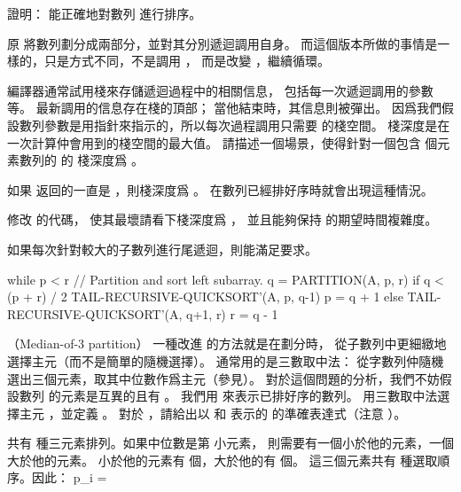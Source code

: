 \startigBase[a]
\startitem
證明：  能正確地對數列  進行排序。
\stopitem

\startANSWER
原  將數列劃分成兩部分，並對其分別遞迴調用自身。
而這個版本所做的事情是一樣的，只是方式不同，不是調用 ，
而是改變 ，繼續循環。
\stopANSWER
\stopigBase

編譯器通常試用{\EMP 棧}來存儲遞迴過程中的相關信息，
包括每一次遞迴調用的參數等。
最新調用的信息存在棧的頂部；
當他結束時，其信息則被{\EMP 彈出}。
因爲我們假設數列參數是用指針來指示的，所以每次過程調用只需要  的棧空間。
{\EMP 棧深度}是在一次計算仲會用到的棧空間的最大值。
\startigBase[a,continue]
\startitem
請描述一個場景，使得針對一個包含  個元素數列的  的
棧深度爲 。
\stopitem

\startANSWER
如果  返回的一直是 ，則棧深度爲 。
在數列已經排好序時就會出現這種情況。
\stopANSWER

\startitem
修改  的代碼，
使其最壞請看下棧深度爲 ，
並且能夠保持  的期望時間複雜度。
\stopitem

\startANSWER
如果每次針對較大的子數列進行尾遞迴，則能滿足要求。

\startCLRS
while p < r
	// Partition and sort left subarray.
	q = PARTITION(A, p, r)
	if q < (p + r) / 2
		TAIL-RECURSIVE-QUICKSORT’(A, p, q-1)
		p = q + 1
	else
		TAIL-RECURSIVE-QUICKSORT’(A, q+1, r)
		r = q - 1
\stopCLRS
\stopANSWER
\stopigBase
\stopPROBLEM

\startPROBLEM
（Median-of-3 partition）
一種改進  的方法就是在劃分時，
從子數列中更細緻地選擇主元（而不是簡單的隨機選擇）。
通常用的是三數取中法：
從字數列仲隨機選出三個元素，取其中位數作爲主元（參見）。
對於這個問題的分析，我們不妨假設數列  的元素是互異的且有 。
我們用  來表示已排好序的數列。
用三數取中法選擇主元 ，並定義 。
\startigBase[a]
\startitem
對於 ，請給出以  和  表示的  的準確表達式（注意 ）。
\stopitem

\startANSWER
共有  種三元素排列。如果中位數是第  小元素，
則需要有一個小於他的元素，一個大於他的元素。
小於他的元素有  個，大於他的有  個。
這三個元素共有  種選取順序。因此：
\startformula
p_i = 
\stopformula
\stopANSWER

